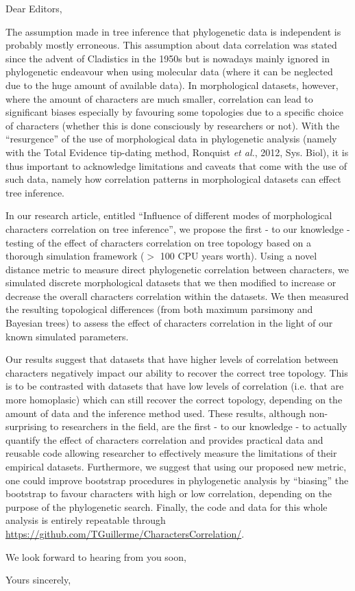 \documentclass[11pt]{letter}
\begin{document}
\begin{letter}{}
\opening{Dear Editors,}

The assumption made in tree inference that phylogenetic data is independent is probably mostly erroneous.
This assumption about data correlation was stated since the advent of Cladistics in the 1950s but is nowadays mainly ignored in phylogenetic endeavour when using molecular data (where it can be neglected due to the huge amount of available data).
In morphological datasets, however, where the amount of characters are much smaller, correlation can lead to significant biases especially by favouring some topologies due to a specific choice of characters (whether this is done consciously by researchers or not).
With the ``resurgence'' of the use of morphological data in phylogenetic analysis (namely with the Total Evidence tip-dating method, Ronquist \textit{et al.}, 2012, Sys. Biol), it is thus important to acknowledge limitations and caveats that come with the use of such data, namely how correlation patterns in morphological datasets can effect tree inference.

In our research article, entitled ``Influence of different modes of morphological characters correlation on tree inference'', we propose the first - to our knowledge - testing of the effect of characters correlation on tree topology based on a thorough simulation framework ($>$ 100 CPU years worth).
Using a novel distance metric to measure direct phylogenetic correlation between characters, we simulated discrete morphological datasets that we then modified to increase or decrease the overall characters correlation within the datasets.
We then measured the resulting topological differences (from both maximum parsimony and Bayesian trees) to assess the effect of characters correlation in the light of our known simulated parameters.

Our results suggest that datasets that have higher levels of correlation between characters negatively impact our ability to recover the correct tree topology.
This is to be contrasted with datasets that have low levels of correlation (i.e. that are more homoplasic) which can still recover the correct topology, depending on the amount of data and the inference method used.
These results, although non-surprising to researchers in the field, are the first - to our knowledge - to actually quantify the effect of characters correlation and provides practical data and reusable code allowing researcher to effectively measure the limitations of their empirical datasets.
Furthermore, we suggest that using our proposed new metric, one could improve bootstrap procedures in phylogenetic analysis by ``biasing'' the bootstrap to favour characters with high or low correlation, depending on the purpose of the phylogenetic search.
Finally, the code and data for this whole analysis is entirely repeatable through \url{https://github.com/TGuillerme/CharactersCorrelation/}.

We look forward to hearing from you soon,

\closing{Yours sincerely,}


\end{letter}
\end{document}
